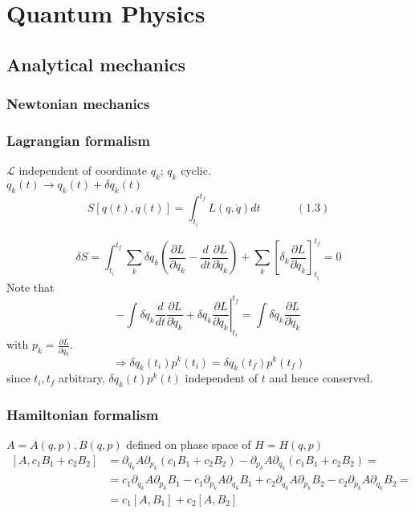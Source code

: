 \documentclass[twoside]{amsart}
\newcommand{\exercisehead}[1]
  {\smallskip
   \noindent{\large\bf Exercise #1.}
   }
\begin{document}
\section{Quantum Physics}

\subsection{Analytical mechanics}

\subsubsection{Newtonian mechanics}

\subsubsection{Lagrangian formalism}

$\mathcal{L}$ independent of coordinate $q_k$; $q_k$ cyclic.  \\

$q_k(t) \to q_k(t) + \delta q_k(t)$
\begin{equation}
S[q(t), \dot{q}(t) ] = \int_{t_i}^{t_f} L(q,\dot{q}) dt \quad \quad \quad \, (1.3)
\end{equation}

\[
\delta S = \int_{t_i}^{t_f} \sum_k \delta q_k \left( \frac{ \partial L}{ \partial q_k} - \frac{d}{dt} \frac{ \partial L}{ \partial \dot{q}_k } \right) + \sum_k \left[ \delta_k \frac{ \partial L}{ \partial \dot{q}_k} \right]_{t_i}^{t_f} = 0 
\]
Note that 
\[
- \int \delta q_k \frac{d}{dt} \frac{ \partial L}{ \partial \dot{q}_k } + \delta q_k \left. \frac{ \partial L}{ \partial \dot{q}_k} \right|_{t_i}^{t_f} = \int \delta \dot{q}_k \frac{ \partial L}{ \partial \dot{q}_k }
\]
with $p_k = \frac{ \partial L}{ \partial \dot{q}_k}$.  
\begin{equation}
\Longrightarrow \delta q_k(t_i) p^k(t_i) = \delta q_k(t_f) p^k(t_f)
\end{equation}
since $t_i,t_f$ arbitrary, $\delta q_k(t) p^k(t)$ independent of $t$ and hence conserved.

\subsubsection{Hamiltonian formalism}

\exercisehead{1.1}  $A = A(q,p), B(q,p)$ defined on phase space of $H = H(q,p)$
\[
\begin{aligned}
  [A, c_1 B_1 + c_2 B_2 ] & = \partial_{q_k} A \partial_{p_k} (c_1 B_1 + c_2 B_2) - \partial_{p_k} A \partial_{q_k} ( c_1 B_1 + c_2 B_2) = \\
  & = c_1 \partial_{q_k} A \partial_{p_k} B_1 - c_1 \partial_{p_k} A \partial_{q_k} B_1 + c_2 \partial_{q_k} A \partial_{p_k} B_2 - c_2 \partial_{p_k} A \partial_{q_k} B_2 = \\
  & = c_1 [ A,B_1] + c_2 [A,B_2]
\end{aligned}
\]
\end{document}
